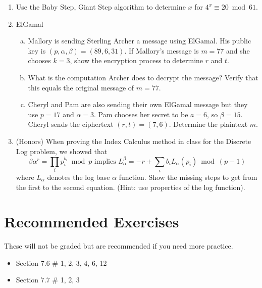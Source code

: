 \documentclass[12pt]{amsart}
\theoremstyle{plain}
\theoremstyle{definition}
\begin{document}
\begin{enumerate}[1.]
    \item Use the Baby Step, Giant Step algorithm to determine $x$ for $4^x \equiv 20 \bmod 61$.
    \begin{framed}
    \vspace{2.5in}
    \end{framed}
    \item ElGamal
    \begin{enumerate}[a.]
    	\item Mallory is sending Sterling Archer a message using ElGamal.  His public key is $(p,\alpha,\beta) = (89,6,31)$.  If Mallory's message is $m = 77$ and she chooses $k = 3$, show the encryption process to determine $r$ and $t$.
        \begin{framed}
        \vspace{1in}
        \end{framed}
        \item What is the computation Archer does to decrypt the message?  Verify that this equals the original message of $m = 77$.
        \begin{framed}
        \vspace{1in}
        \end{framed}
        \item Cheryl and Pam are also sending their own ElGamal message but they use $p = 17$ and $\alpha = 3$.  Pam chooses her secret to be $a = 6$, so $\beta = 15$.  Cheryl sends the ciphertext $(r,t) = (7,6)$.  Determine the plaintext $m$.
        \begin{framed}
        \vspace{1in}
        \end{framed}
    \end{enumerate}
    \item (Honors) When proving the Index Calculus method in class for the Discrete Log problem, we showed that $$\beta \alpha^r = \prod_i p_i^{b_i} \bmod p \text{ implies } L_{\alpha}^{\beta} = -r + \sum_i b_i L_{\alpha}(p_i) \bmod (p-1)$$ where $L_{\alpha}$ denotes the log base $\alpha$ function.  Show the missing steps to get from the first to the second equation. (Hint: use properties of the log function).
	\begin{framed}
    \vspace{3in}
    \end{framed}

\end{enumerate}
	
    
\section{Recommended Exercises}
\noindent These will not be graded but are recommended if you need more practice.
\begin{itemize}
	\item Section 7.6 \# 1, 2, 3, 4, 6, 12
    \item Section 7.7 \# 1, 2, 3
\end{itemize}
\end{document}
